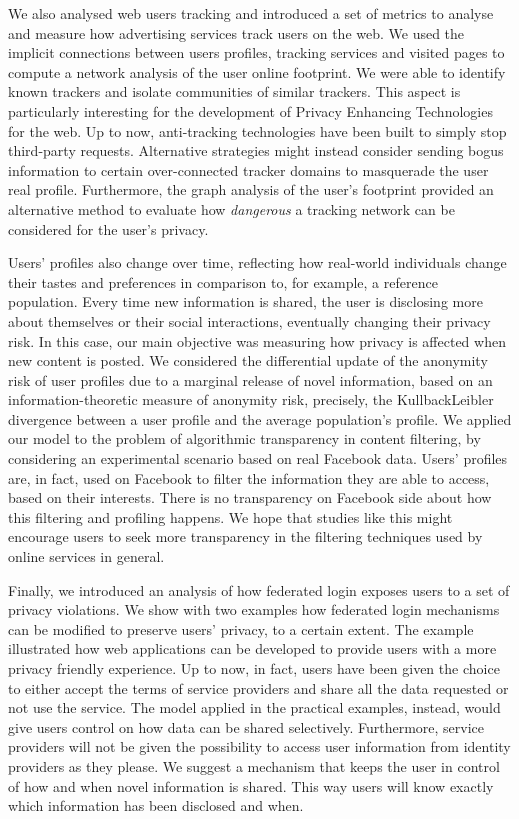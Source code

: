 We also analysed web users tracking and introduced a set of metrics to analyse and measure how advertising services track users on the web. We used the implicit connections between users profiles, tracking services and visited pages to compute a network analysis of the user online footprint. We were able to identify known trackers and isolate communities of similar trackers. This aspect is particularly interesting for the development of Privacy Enhancing Technologies for the web. Up to now, anti-tracking technologies have been built to simply stop third-party requests. Alternative strategies might instead consider sending bogus information to certain over-connected tracker domains to masquerade the user real profile. Furthermore, the graph analysis of the user's footprint provided an alternative method to evaluate how \emph{dangerous} a tracking network can be considered for the user's privacy.

Users' profiles also change over time, reflecting how real-world individuals change their tastes and preferences in comparison to, for example, a reference population. Every time new information is shared, the user is disclosing more about themselves or their social interactions, eventually changing their privacy risk. In this case, our main objective was measuring how privacy is affected when new content is posted. We considered the differential update of the anonymity risk of user profiles due to a marginal release of novel information, based on an information-theoretic measure of anonymity risk, precisely, the Kullback\hyph Leibler divergence between a user profile and the average population's profile.
We applied our model to the problem of algorithmic transparency in content filtering, by considering an experimental scenario based on real Facebook data. Users' profiles are, in fact, used on Facebook to filter the information they are able to access, based on their interests. There is no transparency on Facebook side about how this filtering and profiling happens. We hope that studies like this might encourage users to seek more transparency in the filtering techniques used by online services in general.

Finally, we introduced an analysis of how federated login exposes users to a set of privacy violations. We show with two examples how federated login mechanisms can be modified to preserve users' privacy, to a certain extent. The example illustrated how web applications can be developed to provide users with a more privacy friendly experience. Up to now, in fact, users have been given the choice to either accept the terms of service providers and share all the data requested or not use the service. The model applied in the practical examples, instead, would give users control on how data can be shared selectively. 
Furthermore, service providers will not be given the possibility to access user information from identity providers as they please. We suggest a mechanism that keeps the user in control of how and when novel information is shared. This way users will know exactly which information has been disclosed and when. 

